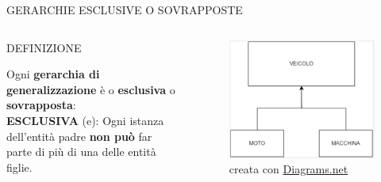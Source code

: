 \documentclass[aspectratio=1610]{beamer}
\begin{document}
\begin{frame}{GERARCHIE ESCLUSIVE O SOVRAPPOSTE}
    \begin{columns}
            \begin{alertblock}{DEFINIZIONE}
                \begin{minipage}{0.96\linewidth}
                    \justifying
                    Ogni \textbf{gerarchia di generalizzazione} è o \textbf{esclusiva} o \textbf{sovrapposta}:\\
                    \bigskip
                    \textbf{ESCLUSIVA} (e): Ogni istanza dell'entità padre \textbf{non può} far parte di più di una delle entità figlie.\\
                    \bigskip
                \end{minipage}
            \end{alertblock}
            \begin{figure}
        \includegraphics[width=.8\linewidth]{img/parziale.png}
        \caption{{creata con \href{https://app.diagrams.net/}{Diagrams.net}}}
            \end{figure}
    \end{columns}
\end{frame}
\end{document}
